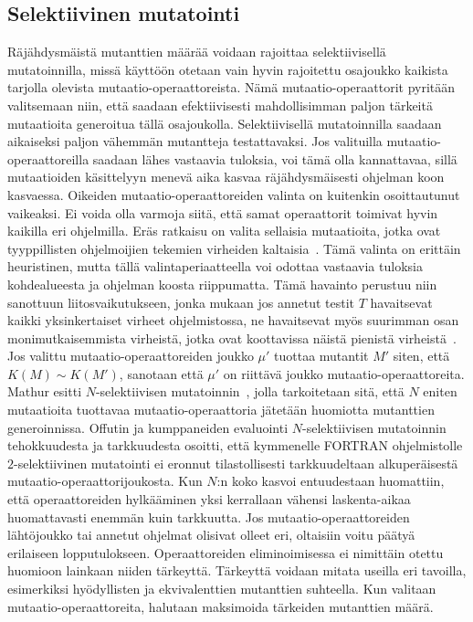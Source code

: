 \documentclass{tktltiki}
\begin{document}
\subsection{Selektiivinen mutatointi}
Räjähdysmäistä mutanttien määrää voidaan rajoittaa selektiivisellä mutatoinnilla, missä käyttöön otetaan vain hyvin rajoitettu osajoukko kaikista tarjolla olevista mutaatio-operaattoreista. Nämä mutaatio-operaattorit pyritään valitsemaan niin, että saadaan efektiivisesti mahdollisimman paljon tärkeitä mutaatioita generoitua tällä osajoukolla. Selektiivisellä mutatoinnilla saadaan aikaiseksi paljon vähemmän mutantteja testattavaksi. Jos valituilla mutaatio-operaattoreilla saadaan lähes vastaavia tuloksia, voi tämä olla kannattavaa, sillä mutaatioiden käsittelyyn menevä aika kasvaa räjähdysmäisesti ohjelman koon kasvaessa. Oikeiden mutaatio-operaattoreiden valinta on kuitenkin osoittautunut vaikeaksi. Ei voida olla varmoja siitä, että samat operaattorit toimivat hyvin kaikilla eri ohjelmilla. Eräs ratkaisu on valita sellaisia mutaatioita, jotka ovat tyyppillisten ohjelmoijien tekemien virheiden kaltaisia~\cite{}. Tämä valinta on erittäin heuristinen, mutta tällä valintaperiaatteella voi odottaa vastaavia tuloksia kohdealueesta ja ohjelman koosta riippumatta. Tämä havainto perustuu niin sanottuun liitosvaikutukseen, jonka mukaan jos annetut testit $T$ havaitsevat kaikki yksinkertaiset virheet ohjelmistossa, ne havaitsevat myös suurimman osan monimutkaisemmista virheistä, jotka ovat koottavissa näistä pienistä virheistä~\cite{}. Jos valittu mutaatio-operaattoreiden joukko $\mu'$ tuottaa mutantit $M'$ siten, että $K(M) \sim K(M')$, sanotaan että $\mu'$ on riittävä joukko mutaatio-operaattoreita. Mathur esitti $N$-selektiivisen mutatoinnin~\cite{}, jolla tarkoitetaan sitä, että $N$ eniten mutaatioita tuottavaa mutaatio-operaattoria jätetään huomiotta mutanttien generoinnissa. Offutin ja kumppaneiden evaluointi $N$-selektiivisen mutatoinnin tehokkuudesta ja tarkkuudesta osoitti, että kymmenelle FORTRAN ohjelmistolle $2$-selektiivinen mutatointi ei eronnut tilastollisesti tarkkuudeltaan alkuperäisestä mutaatio-operaattorijoukosta. Kun $N$:n koko kasvoi entuudestaan huomattiin, että operaattoreiden hylkääminen yksi kerrallaan vähensi laskenta-aikaa huomattavasti enemmän kuin tarkkuutta. Jos mutaatio-operaattoreiden lähtöjoukko tai annetut ohjelmat olisivat olleet eri, oltaisiin voitu päätyä erilaiseen lopputulokseen. Operaattoreiden eliminoimisessa ei nimittäin otettu huomioon lainkaan niiden tärkeyttä. Tärkeyttä voidaan mitata useilla eri tavoilla, esimerkiksi hyödyllisten ja ekvivalenttien mutanttien suhteella. Kun valitaan mutaatio-operaattoreita, halutaan maksimoida tärkeiden mutanttien määrä.
\end{document}
